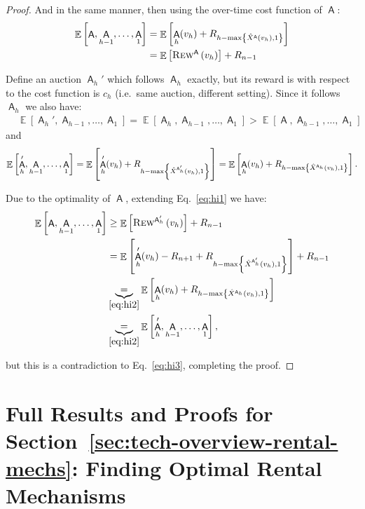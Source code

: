 \documentclass[11pt,letterpaper]{article}
\newcommand{\set}[1]{\left\{#1\right\}}
\newcommand{\sqbr}[1]{\left[ #1 \right]}
\DeclareMathOperator*{\E}{\bb{E}}
\newcommand{\bb}[1]{\mathbb{#1}}
\DeclareMathOperator{\A}{\auc{A}}
\theoremstyle{plain}
\newcommand{\auc}[1]{\mathsf{#1}}
\begin{document}
\begin{proof}
    And in the same manner, then using the over-time cost function of $\A$:
    \begin{align}
        \E\sqbr{\A,\A_{h-1},\dots,\A_1}&=\E\sqbr{\A_h(v_h)+R_{h-\max\set{\xhat[\A]{v_h},1}}}\\
        &=\E\sqbr{\trew[\A]{v_h}}+R_{n-1}\label{eq:hi1}
    \end{align}

    Define an auction $\A_h'$ which follows $\A_h$ exactly, but its reward is with respect to the cost function is $c_{h}$ (i.e.\ same auction, different setting). Since it follows $\A_h$ we also have:
    \begin{align}\label{eq:hi3}
        &\E\sqbr{\A_h',\A_{h-1},\dots,\A_1}=\E\sqbr{\A_h,\A_{h-1},\dots,\A_1}>\E\sqbr{\A,\A_{h-1},\dots,\A_1}
    \end{align}
    and
    \begin{align}\label{eq:hi2}
        \E\sqbr{\A_h',\A_{h-1},\dots,\A_1}=\E\sqbr{\A_h'(v_h)+R_{h-\max\set{\xhat[\A_h']{v_h},1}}}=\E\sqbr{\A_h(v_h)+R_{h-\max\set{\xhat[\A_h]{v_h},1}}}.
    \end{align}

    Due to the optimality of $\A$, extending Eq.~\ref{eq:hi1} we have:
    \begin{align*}
        \E\sqbr{\A,\A_{h-1},\dots,\A_1}
        &\geq\E\sqbr{\trew[\A_h']{v_h}}+R_{n-1}\\
        &=\E\sqbr{\A_h'(v_h)-R_{n+1}+R_{h-\max\set{\xhat[\A_h']{v_h},1}}}+R_{n-1}\\
        &\underbrace{=}_{\ref{eq:hi2}}\E\sqbr{\A_h(v_h)+R_{h-\max\set{\xhat[\A_h]{v_h},1}}}\\
        &\underbrace{=}_{\ref{eq:hi2}}\E\sqbr{\A_h',\A_{h-1},\dots,\A_1},
    \end{align*}

    but this is a contradiction to Eq.~\ref{eq:hi3}, completing the proof.
\end{proof}%

% 

\section{Full Results and Proofs for Section~\ref{sec:tech-overview-rental-mechs}: Finding Optimal Rental Mechanisms}\label{app:rental-mechs}
\end{document}
